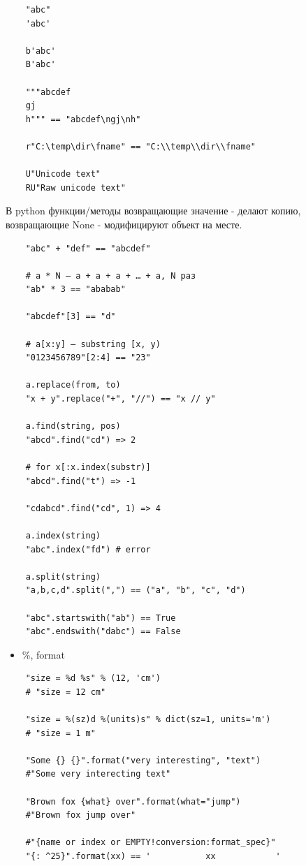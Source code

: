 \documentclass{article}
\begin{document}
\vspace{15pt}
\begin{lstlisting}
	"abc"
	'abc'

	b'abc'
	B'abc'

	"""abcdef
	gj
	h""" == "abcdef\ngj\nh"

	r"C:\temp\dir\fname" == "C:\\temp\\dir\\fname"

	U"Unicode text"
	RU"Raw unicode text"
\end{lstlisting}
\newpage


В python функции/методы возвращающие значение - делают копию, 
	возвращающие None - модифицируют объект на месте.

\vspace{15pt}
\begin{lstlisting}
	"abc" + "def" == "abcdef"

	# a * N – a + a + a + … + a, N раз
	"ab" * 3 == "ababab"

	"abcdef"[3] == "d"

	# a[x:y] – substring [x, y)
	"0123456789"[2:4] == "23"

	a.replace(from, to)
	"x + y".replace("+", "//") == "x // y"

	a.find(string, pos) 
	"abcd".find("cd") => 2
	
	# for x[:x.index(substr)]
	"abcd".find("t") => -1

	"cdabcd".find("cd", 1) => 4

	a.index(string)
	"abc".index("fd") # error

	a.split(string) 
	"a,b,c,d".split(",") == ("a", "b", "c", "d")

	"abc".startswith("ab") == True
	"abc".endswith("dabc") == False
\end{lstlisting}
\newpage

\begin{itemize}
	\item \%, format
\end{itemize}

\vspace{15pt}
\begin{lstlisting}
	"size = %d %s" % (12, 'cm') 
	# "size = 12 cm"

	"size = %(sz)d %(units)s" % dict(sz=1, units='m') 
	# "size = 1 m"

	"Some {} {}".format("very interesting", "text")
	#"Some very interecting text"

	"Brown fox {what} over".format(what="jump")
	#"Brown fox jump over"

	#"{name or index or EMPTY!conversion:format_spec}"
	"{: ^25}".format(xx) == '           xx            '
\end{lstlisting}
\newpage
\end{document}
